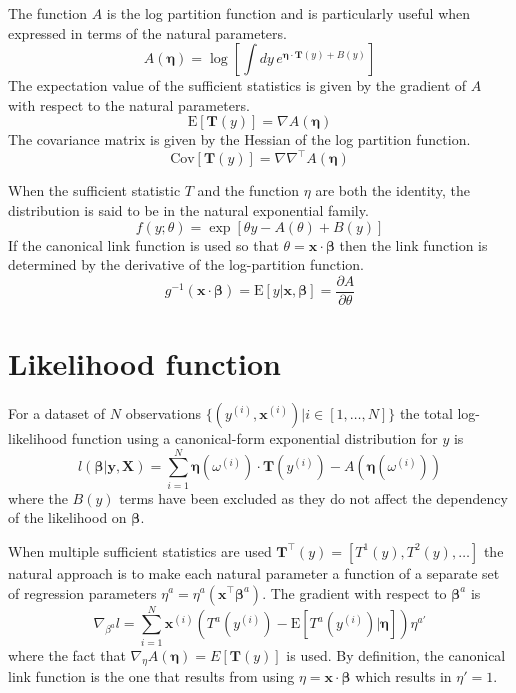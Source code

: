 \documentclass{article}
\newcommand{\bbeta}{\boldsymbol{\beta}}
\begin{document}
The function \(A\) is the log partition function and is particularly useful when
expressed in terms of the natural parameters.
\[ A(\boldsymbol{\eta}) = \log \left[ \int dy \, e^{\boldsymbol{\eta} \cdot \mathbf{T}(y) + B(y)} \right] \]
The expectation value of the sufficient statistics is given by the gradient of
\(A\) with respect to the natural parameters.
\[ \textrm{E}[\mathbf{T}(y)] = \nabla A(\boldsymbol{\eta}) \]
The covariance matrix is given by the Hessian of the log partition function.
\[
	\textrm{Cov}[\mathbf{T}(y)] = \nabla \nabla^\intercal A(\boldsymbol{\eta})
\]

When the sufficient statistic \(T\) and the function \(\eta\) are both the identity,
the distribution is said to be in the {natural exponential family}.
\[ f(y; \theta) = \exp[\theta y - A(\theta) + B(y)] \]
If the canonical link function is used so that \(\theta = \mathbf{x} \cdot
\bbeta\) then the link function is determined by the derivative of
the log-partition function.
\[ g^{-1}(\mathbf{x}\cdot\bbeta) = \textrm{E}[y|\mathbf{x}, \bbeta] = \frac{\partial
		A}{\partial \theta} \]

\section{Likelihood function}

For a dataset of \(N\) observations \(\{(y^{(i)}, \mathbf{x}^{(i)}) | i \in [1,
	\ldots, N]\}\) the total log-likelihood function using a canonical-form
exponential distribution for \(y\) is
\[l(\bbeta | \mathbf{y}, \mathbf{X}) = \sum_{i=1}^N
	\boldsymbol{\eta}(\omega^{(i)}) \cdot
	\mathbf{T}(y^{(i)}) - A\left(\boldsymbol{\eta}(\omega^{(i)}) \right)\]
where the \(B(y)\) terms have been excluded as they do not affect the dependency
of the likelihood on \(\bbeta\).

When multiple sufficient statistics are used \(\mathbf{T}^\intercal(y) = [T^1
(y), T^2(y), \ldots]\) the natural approach is to make each
natural parameter a function of a separate set of regression parameters
\(\eta^a = \eta^a(\mathbf{x}^\intercal \bbeta^a)\).
The gradient with respect to \(\bbeta^a\) is
\begin{equation}
	\nabla_{\beta^a} l = \sum_{i=1}^N \mathbf{x}^{(i)} \left( T^a (y^{(i)}) -
	\textrm{E}[T^a (y^{(i)})|\boldsymbol{\eta}] \right) \eta^{a\prime}
\end{equation}
where the fact that \(\nabla_\eta A(\boldsymbol{\eta}) = E[\mathbf{T}(y)]\) is used.
By definition, the canonical link function is the one that results from using
\(\eta = \mathbf{x}\cdot\bbeta\) which results in \(\eta' = 1\).
\end{document}
